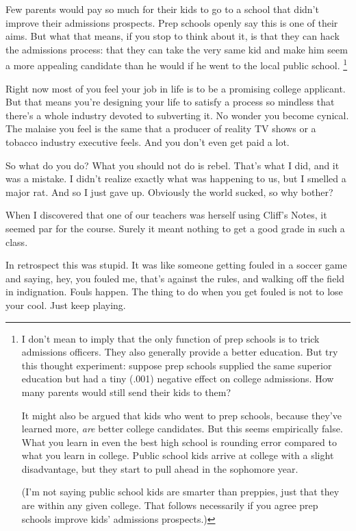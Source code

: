 \documentclass[12pt]{book}
\begin{document}
Few parents would pay so much for their kids to go to a school that
didn't improve their admissions prospects. Prep schools openly say this
is one of their aims. But what that means, if you stop to think about
it, is that they can hack the admissions process: that they can take the
very same kid and make him seem a more appealing candidate than he would
if he went to the local public school. \footnote{I don't mean to imply that the only function of prep schools is
to trick admissions officers. They also generally provide a better
education. But try this thought experiment: suppose prep schools
supplied the same superior education but had a tiny (.001) negative
effect on college admissions. How many parents would still send their
kids to them?

It might also be argued that kids who went to prep schools, because
they've learned more, \emph{are} better college candidates. But this
seems empirically false. What you learn in even the best high school is
rounding error compared to what you learn in college. Public school kids
arrive at college with a slight disadvantage, but they start to pull
ahead in the sophomore year.

(I'm not saying public school kids are smarter than preppies, just that
they are within any given college. That follows necessarily if you agree
prep schools improve kids' admissions prospects.)}

Right now most of you feel your job in life is to be a promising college
applicant. But that means you're designing your life to satisfy a
process so mindless that there's a whole industry devoted to subverting
it. No wonder you become cynical. The malaise you feel is the same that
a producer of reality TV shows or a tobacco industry executive feels.
And you don't even get paid a lot.

So what do you do? What you should not do is rebel. That's what I did,
and it was a mistake. I didn't realize exactly what was happening to us,
but I smelled a major rat. And so I just gave up. Obviously the world
sucked, so why bother?

When I discovered that one of our teachers was herself using Cliff's
Notes, it seemed par for the course. Surely it meant nothing to get a
good grade in such a class.

In retrospect this was stupid. It was like someone getting fouled in a
soccer game and saying, hey, you fouled me, that's against the rules,
and walking off the field in indignation. Fouls happen. The thing to do
when you get fouled is not to lose your cool. Just keep playing.
\end{document}
